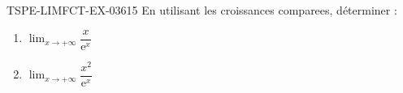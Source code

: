 \begin{exercice}{TSPE-LIMFCT-EX-036}{1}{5}
En utilisant les croissances comparees, déterminer :
\begin{enumerate}
  \item $\lim_{x \to +\infty} \dfrac{x}{\mathrm{e}^x}$
  \item $\lim_{x \to +\infty} \dfrac{x^2}{\mathrm{e}^x}$
\end{enumerate}
\end{exercice}
